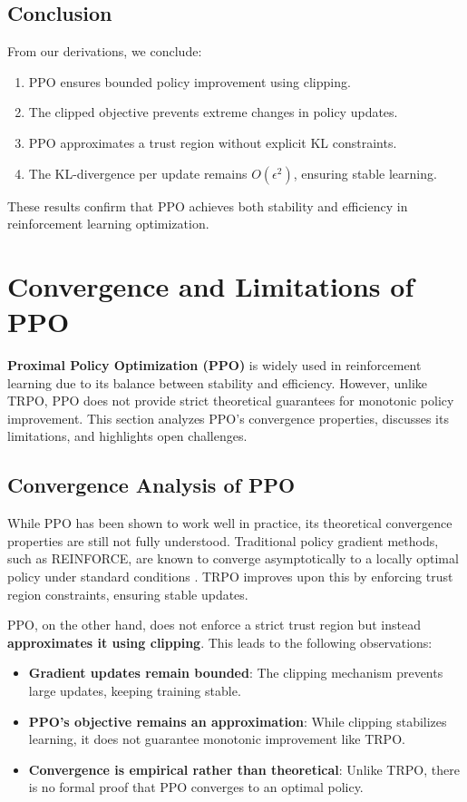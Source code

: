\documentclass[12pt]{extreport} %
\begin{document}
\subsection{Conclusion}
From our derivations, we conclude:
\begin{enumerate}
    \item PPO ensures bounded policy improvement using clipping.
    \item The clipped objective prevents extreme changes in policy updates.
    \item PPO approximates a trust region without explicit KL constraints.
    \item The KL-divergence per update remains $O(\epsilon^2)$, ensuring stable learning.
\end{enumerate}

These results confirm that PPO achieves both stability and efficiency in reinforcement learning optimization.

\section{\textbf{Convergence and Limitations of PPO}}

\textbf{Proximal Policy Optimization (PPO)} is widely used in reinforcement learning due to its balance between stability and efficiency. However, unlike TRPO, PPO does not provide strict theoretical guarantees for monotonic policy improvement. This section analyzes PPO's convergence properties, discusses its limitations, and highlights open challenges.

\subsection{\textbf{Convergence Analysis of PPO}}

While PPO has been shown to work well in practice, its theoretical convergence properties are still not fully understood. Traditional policy gradient methods, such as REINFORCE, are known to converge asymptotically to a locally optimal policy under standard conditions \cite{sutton1999policy}. TRPO improves upon this by enforcing trust region constraints, ensuring stable updates.

PPO, on the other hand, does not enforce a strict trust region but instead \textbf{approximates it using clipping}. This leads to the following observations:

\begin{itemize}
    \item \textbf{Gradient updates remain bounded}: The clipping mechanism prevents large updates, keeping training stable.
    \item \textbf{PPO's objective remains an approximation}: While clipping stabilizes learning, it does not guarantee monotonic improvement like TRPO.
    \item \textbf{Convergence is empirical rather than theoretical}: Unlike TRPO, there is no formal proof that PPO converges to an optimal policy.
\end{itemize}
\end{document}
